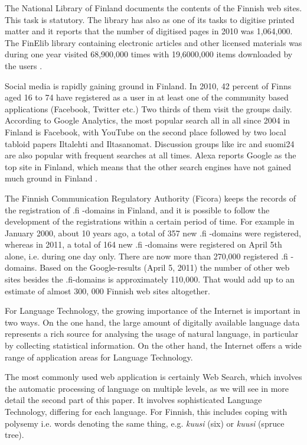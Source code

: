 \documentclass[]{../../metanetpaper}
\begin{document}
\begin{multicols}{2}
The National Library of Finland documents the contents of the Finnish web
sites. This task is statutory. The library has also as one of its tasks to
digitise printed matter and it reports that the number of digitised pages in
2010 was 1,064,000. The FinElib library containing electronic articles and
other licensed materials was during one year visited 68,900,000 times with
19,6000,000 items downloaded by the users \cite{natlibstat}.

Social media is rapidly gaining ground in Finland. In 2010, 42 percent
of Finns aged 16 to 74 have registered as a user in at least one of the
community based applications (Facebook, Twitter etc.) Two thirds of
them visit the groups daily. According to Google Analytics, the most
popular search all in all since 2004 in Finland is Facebook, with
YouTube on the second place followed by two local tabloid papers
Iltalehti and Iltasanomat. Discussion groups like irc and suomi24 are
also popular with frequent searches at all times. Alexa reports Google
as the top site in Finland, which means that the other search engines
have not gained much ground in Finland \cite{topsites}.

The Finnish Communication Regulatory Authority (Ficora) keeps the
records of the registration of .fi -domains in Finland, and it is
possible to follow the development of the registrations within a
certain period of time. For example in January 2000, about 10 years
ago, a total of 357 new .fi -domains were registered, whereas in 2011,
a total of 164 new .fi -domains were registered on April 5th alone,
i.e. during one day only. There are now more than 270,000 registered
.fi -domains. Based on the Google-results (April 5, 2011) the number
of other web sites besides the .fi-domains is approximately
110,000. That would add up to an estimate of almost 300, 000 Finnish
web sites altogether.

For Language Technology, the growing importance of the Internet is
important in two ways. On the one hand, the large amount of digitally
available language data represents a rich source for analysing the
usage of natural language, in particular by collecting statistical
information. On the other hand, the Internet offers a wide range of
application areas for Language Technology.

The most commonly used web application is certainly Web Search, which
involves the automatic processing of language on multiple levels, as
we will see in more detail the second part of this paper. It involves
sophisticated Language Technology, differing for each language. For
Finnish, this includes coping with polysemy
i.e. words denoting the same thing, e.g.
\textit{\foreignlanguage{finnish}{\textit{kuusi}}} (six) or
\textit{\foreignlanguage{finnish}{\textit{kuusi}}} (spruce tree).


\end{multicols}
\end{document}
